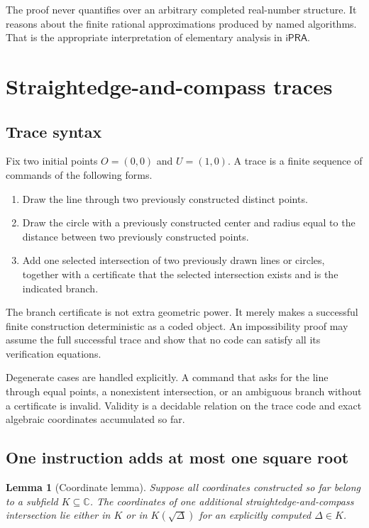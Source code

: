 \documentclass[11pt]{article}
\newtheorem{lemma}[theorem]{Lemma}
\newcommand{\C}{\mathbb{C}}
\newcommand{\ipra}{\mathsf{iPRA}}
\begin{document}
The proof never quantifies over an arbitrary completed real-number structure.  It reasons about the finite rational approximations produced by named algorithms.  That is the appropriate interpretation of elementary analysis in $\ipra$.

\section{Straightedge-and-compass traces}

\subsection{Trace syntax}

Fix two initial points $O=(0,0)$ and $U=(1,0)$.  A trace is a finite sequence of commands of the following forms.

\begin{enumerate}
\item Draw the line through two previously constructed distinct points.
\item Draw the circle with a previously constructed center and radius equal to the distance between two previously constructed points.
\item Add one selected intersection of two previously drawn lines or circles, together with a certificate that the selected intersection exists and is the indicated branch.
\end{enumerate}

The branch certificate is not extra geometric power.  It merely makes a successful finite construction deterministic as a coded object.  An impossibility proof may assume the full successful trace and show that no code can satisfy all its verification equations.

Degenerate cases are handled explicitly.  A command that asks for the line through equal points, a nonexistent intersection, or an ambiguous branch without a certificate is invalid.  Validity is a decidable relation on the trace code and exact algebraic coordinates accumulated so far.

\subsection{One instruction adds at most one square root}

\begin{lemma}[Coordinate lemma]
Suppose all coordinates constructed so far belong to a subfield $K\subseteq\C$.  The coordinates of one additional straightedge-and-compass intersection lie either in $K$ or in $K(\sqrt{\Delta})$ for an explicitly computed $\Delta\in K$.
\end{lemma}
\end{document}
